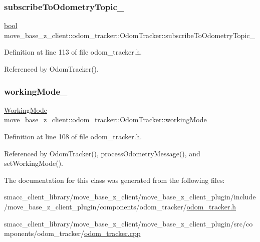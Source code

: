 \subsubsection{\texorpdfstring{subscribe\+To\+Odometry\+Topic\+\_\+}{subscribeToOdometryTopic\_}}
{\footnotesize\ttfamily \hyperlink{classbool}{bool} move\+\_\+base\+\_\+z\+\_\+client\+::odom\+\_\+tracker\+::\+Odom\+Tracker\+::subscribe\+To\+Odometry\+Topic\+\_\+\hspace{0.3cm}{\ttfamily [protected]}}



Definition at line 113 of file odom\+\_\+tracker.\+h.



Referenced by Odom\+Tracker().

\mbox{\label{classmove__base__z__client_1_1odom__tracker_1_1OdomTracker_a39c97d7bf6003fde62e0bed1a221e3f0}} 
\subsubsection{\texorpdfstring{working\+Mode\+\_\+}{workingMode\_}}
{\footnotesize\ttfamily \hyperlink{namespacemove__base__z__client_1_1odom__tracker_adf3e5fc3644563922cc64a20a0197224}{Working\+Mode} move\+\_\+base\+\_\+z\+\_\+client\+::odom\+\_\+tracker\+::\+Odom\+Tracker\+::working\+Mode\+\_\+\hspace{0.3cm}{\ttfamily [protected]}}



Definition at line 108 of file odom\+\_\+tracker.\+h.



Referenced by Odom\+Tracker(), process\+Odometry\+Message(), and set\+Working\+Mode().



The documentation for this class was generated from the following files\+:\begin{DoxyCompactItemize}
\item 
smacc\+\_\+client\+\_\+library/move\+\_\+base\+\_\+z\+\_\+client/move\+\_\+base\+\_\+z\+\_\+client\+\_\+plugin/include/move\+\_\+base\+\_\+z\+\_\+client\+\_\+plugin/components/odom\+\_\+tracker/\hyperlink{odom__tracker_8h}{odom\+\_\+tracker.\+h}\item 
smacc\+\_\+client\+\_\+library/move\+\_\+base\+\_\+z\+\_\+client/move\+\_\+base\+\_\+z\+\_\+client\+\_\+plugin/src/components/odom\+\_\+tracker/\hyperlink{odom__tracker_8cpp}{odom\+\_\+tracker.\+cpp}\end{DoxyCompactItemize}
